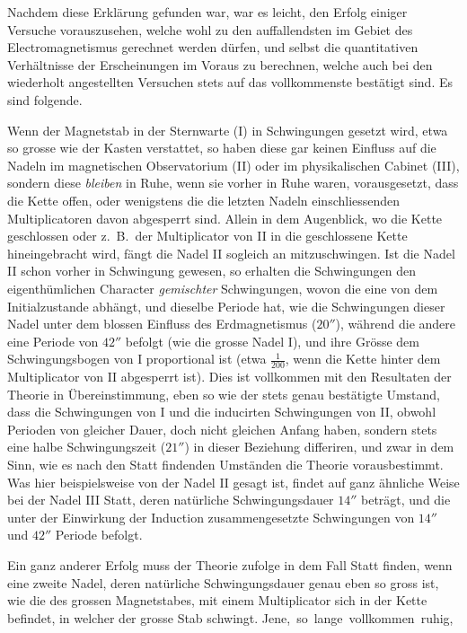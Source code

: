 \par\clearpage
{}
Nachdem diese Erklärung gefunden war, war es leicht, den Erfolg einiger Versuche vorauszusehen, welche wohl zu den auffallendsten im Gebiet des Electromagnetismus gerechnet werden dürfen, und selbst die quantitativen Verhältnisse der Erscheinungen im Voraus zu berechnen, welche auch bei den wiederholt angestellten Versuchen stets auf das vollkommenste bestätigt sind. Es sind folgende.

Wenn der Magnetstab in der Sternwarte (I) in Schwingungen gesetzt wird, etwa so grosse wie der Kasten verstattet, so haben diese gar keinen Einfluss auf die Nadeln im magnetischen Observatorium (II) oder im physikalischen Cabinet (III), sondern diese \textit{bleiben} in Ruhe, wenn sie vorher in Ruhe waren, vorausgesetzt, dass die Kette offen, oder wenigstens die die letzten Nadeln einschliessenden Multiplicatoren davon abgesperrt sind. Allein in dem Augenblick, wo die Kette geschlossen oder z.\ B.\ der Multiplicator von II in die geschlossene Kette hineingebracht wird, fängt die Nadel II sogleich an mitzuschwingen. Ist die Nadel II schon vorher in Schwingung gewesen, so erhalten die Schwingungen den eigenthümlichen Character \textit{gemischter} Schwingungen, wovon die eine von dem Initialzustande abhängt, und dieselbe Periode hat, wie die Schwingungen dieser Nadel unter dem blossen Einfluss des Erdmagnetismus ($20''$), während die andere eine Periode von $42''$ befolgt (wie die grosse Nadel I), und ihre Grösse dem Schwingungsbogen von I proportional ist (etwa $\frac{1}{200}$, wenn die Kette hinter dem Multiplicator von II abgesperrt ist). Dies ist vollkommen mit den Resultaten der Theorie in Übereinstimmung, eben so wie der stets genau bestätigte Umstand, dass die Schwingungen von I und die inducirten Schwingungen von II, obwohl Perioden von gleicher Dauer, doch nicht gleichen Anfang haben, sondern stets eine halbe Schwingungszeit ($21''$) in dieser Beziehung differiren, und zwar in dem Sinn, wie es nach den Statt findenden Umständen die Theorie vorausbestimmt. Was hier beispielsweise von der Nadel II gesagt ist, findet auf ganz ähnliche Weise bei der Nadel III Statt, deren natürliche Schwingungsdauer $14''$ beträgt, und die unter der Einwirkung der Induction zusammengesetzte Schwingungen von $14''$ und $42''$ Periode befolgt.

Ein ganz anderer Erfolg muss der Theorie zufolge in dem Fall Statt finden, wenn eine zweite Nadel, deren natürliche Schwingungsdauer genau eben so gross ist, wie die des grossen Magnetstabes, mit einem Multiplicator sich in der Kette befindet, in welcher der grosse Stab schwingt. Jene,~so~lange~vollkommen~ruhig,
